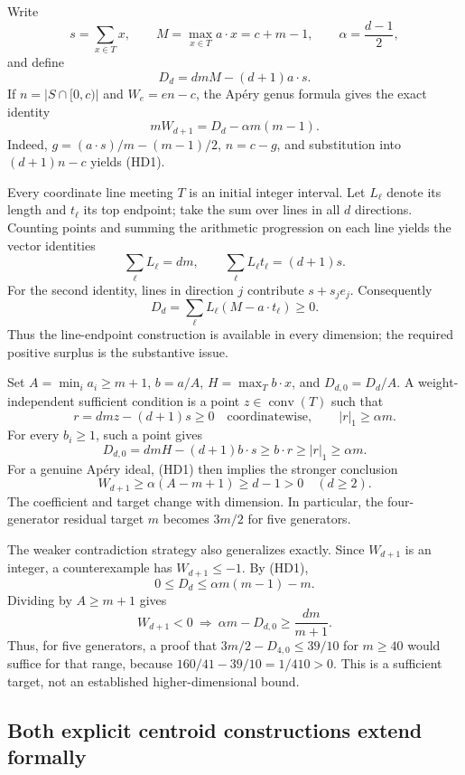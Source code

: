 \documentclass[
  11pt,
  a4paper,
]{article}
\begin{document}
Write \[
s=\sum_{x\in T}x,\qquad
M=\max_{x\in T}a\cdot x=c+m-1,\qquad
\alpha=\frac{d-1}{2},
\] and define \[
D_d=dmM-(d+1)a\cdot s.
\] If \(n=|S\cap[0,c)|\) and \(W_e=en-c\), the Apéry genus formula gives
the exact identity \[
\boxed{mW_{d+1}=D_d-\alpha m(m-1).}
\tag{HD1}
\] Indeed, \(g=(a\cdot s)/m-(m-1)/2\), \(n=c-g\), and substitution into
\((d+1)n-c\) yields (HD1).

Every coordinate line meeting \(T\) is an initial integer interval. Let
\(L_\ell\) denote its length and \(t_\ell\) its top endpoint; take the
sum over lines in all \(d\) directions. Counting points and summing the
arithmetic progression on each line yields the vector identities \[
\sum_\ell L_\ell=dm,
\qquad
\sum_\ell L_\ell t_\ell=(d+1)s.
\tag{HD2}
\] For the second identity, lines in direction \(j\) contribute
\(s+s_j e_j\). Consequently \[
D_d=\sum_\ell L_\ell(M-a\cdot t_\ell)\ge0.
\tag{HD3}
\] Thus the line-endpoint construction is available in every dimension;
the required positive surplus is the substantive issue.

Set \(A=\min_i a_i\ge m+1\), \(b=a/A\), \(H=\max_T b\cdot x\), and
\(D_{d,0}=D_d/A\). A weight-independent sufficient condition is a point
\(z\in\operatorname{conv}(T)\) such that \[
r=dmz-(d+1)s\ge0\quad\text{coordinatewise},
\qquad
|r|_1\ge\alpha m.
\tag{HD4}
\] For every \(b_i\ge1\), such a point gives \[
D_{d,0}=dmH-(d+1)b\cdot s
\ge b\cdot r\ge|r|_1\ge\alpha m.
\] For a genuine Apéry ideal, (HD1) then implies the stronger conclusion
\[
W_{d+1}\ge\alpha(A-m+1)\ge d-1>0
\quad(d\ge2).
\tag{HD5}
\] The coefficient and target change with dimension. In particular, the
four-generator residual target \(m\) becomes \(3m/2\) for five
generators.

The weaker contradiction strategy also generalizes exactly. Since
\(W_{d+1}\) is an integer, a counterexample has \(W_{d+1}\le-1\). By
(HD1), \[
0\le D_d\le\alpha m(m-1)-m.
\] Dividing by \(A\ge m+1\) gives \[
\boxed{W_{d+1}<0\ \Longrightarrow\
\alpha m-D_{d,0}\ge\frac{dm}{m+1}.}
\tag{HD6}
\] Thus, for five generators, a proof that \(3m/2-D_{4,0}\le39/10\) for
\(m\ge40\) would suffice for that range, because
\(160/41-39/10=1/410>0\). This is a sufficient target, not an
established higher-dimensional bound.

\hypertarget{both-explicit-centroid-constructions-extend-formally}{%
\subsection{Both explicit centroid constructions extend
formally}\label{both-explicit-centroid-constructions-extend-formally}}
\end{document}
